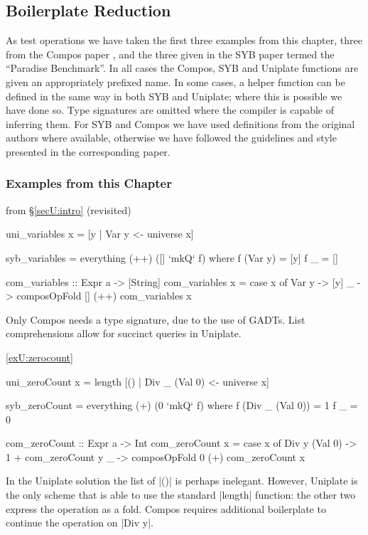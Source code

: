 \subsection{Boilerplate Reduction}
\label{secU:results_boilerplate}

As test operations we have taken the first three examples from this chapter, three from the Compos paper \citep{bringert:compos}, and the three given in the SYB paper \citep{lammel:syb} termed the ``Paradise Benchmark''. In all cases the Compos, SYB and Uniplate functions are given an appropriately prefixed name. In some cases, a helper function can be defined in the same way in both SYB and Uniplate; where this is possible we have done so. Type signatures are omitted where the compiler is capable of inferring them. For SYB and Compos we have used definitions from the original authors where available, otherwise we have followed the guidelines and style presented in the corresponding paper.

\subsubsection{Examples from this Chapter}

\begin{exampleany}{from \S\ref{secU:intro} (revisited)}

\ignore\begin{code}
uni_variables x = [y | Var y <- universe x]

syb_variables = everything (++) ([] `mkQ` f)
    where  f (Var y)  = [y]
           f _        = []

com_variables :: Expr a -> [String]
com_variables x = case x of
    Var y -> [y]
    _ -> composOpFold [] (++) com_variables x
\end{code}

Only Compos needs a type signature, due to the use of GADTs. List comprehensions allow for succinct queries in Uniplate.
\end{exampleany}

\begin{examplerevisit}{\ref{exU:zerocount}}

\ignore\begin{code}
uni_zeroCount x = length [() | Div _ (Val 0) <- universe x]

syb_zeroCount = everything (+) (0 `mkQ` f)
    where  f (Div _ (Val 0))  = 1
           f _                = 0

com_zeroCount :: Expr a -> Int
com_zeroCount x = case x of
    Div y (Val 0) -> 1 + com_zeroCount y
    _ -> composOpFold 0 (+) com_zeroCount x
\end{code}

In the Uniplate solution the list of |()| is perhaps inelegant. However, Uniplate is the only scheme that is able to use the standard |length| function: the other two express the operation as a fold. Compos requires additional boilerplate to continue the operation on |Div y|.
\end{examplerevisit}

